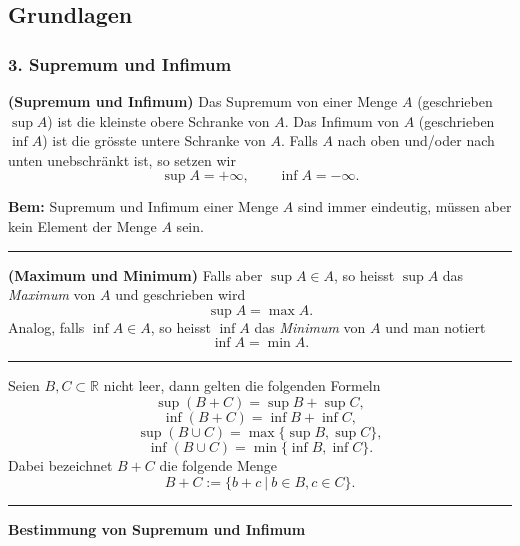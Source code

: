 \documentclass[a4paper,landscape,8pt]{extarticle}
\newcommand{\R}{\mathbb{R}}
\newcommand{\setsep}{\ \vert \ }
\newcommand{\sep}{\vspace{5pt}\noindent\hrule\vspace{5pt}}
\newcommand{\Bem}{\textbf{Bem: }}
\begin{document}
\setlength{\belowdisplayskip}{4pt} \setlength{\belowdisplayshortskip}{4pt}
\setlength{\abovedisplayskip}{4pt} \setlength{\abovedisplayshortskip}{4pt}

\allowdisplaybreaks

\begin{multicols*}{4}
\raggedcolumns


\setcounter{tocdepth}{2}
\tableofcontents

\part{Grundlagen}
 
\section{3. Supremum und Infimum}

\Def \textbf{(Supremum und Infimum)} Das Supremum von einer Menge $A$
(geschrieben $\sup A$) ist die kleinste obere Schranke von $A$. Das Infimum von
$A$ (geschrieben $\inf A$) ist die grösste untere Schranke von $A$. Falls $A$
nach oben und/oder nach unten unebschränkt ist, so setzen wir
\[
\sup A = +\infty, \qquad \inf A = -\infty.
\]

\Bem Supremum und Infimum einer Menge $A$ sind immer eindeutig, müssen aber kein
Element der Menge $A$ sein.

\sep

\Def \textbf{(Maximum und Minimum)} Falls aber $\sup A \in A$, so heisst $\sup
A$ das \emph{Maximum} von $A$ und geschrieben wird
\[
\sup A = \max A.
\]
Analog, falls $\inf A \in A$, so heisst $\inf A$ das \emph{Minimum} von $A$ und
man notiert
\[
\inf A = \min A.
\]

\sep


Seien $B,C\subset\R$ nicht leer, dann gelten die folgenden Formeln
\[
\sup(B+C) = \sup B + \sup C,
\]
\[
\inf(B+C) = \inf B + \inf C,
\]
\[
\sup(B\cup C) = \max \{\sup B, \sup C\},
\]
\[
\inf(B\cup C)=\min\{\inf B,\inf C\}.
\]
Dabei bezeichnet $B+C$ die folgende Menge
\[
B+C := \{b+c \setsep b\in B, c\in C\}.
\]


\sep

\textbf{Bestimmung von Supremum und Infimum}


\end{multicols*}
\end{document}
